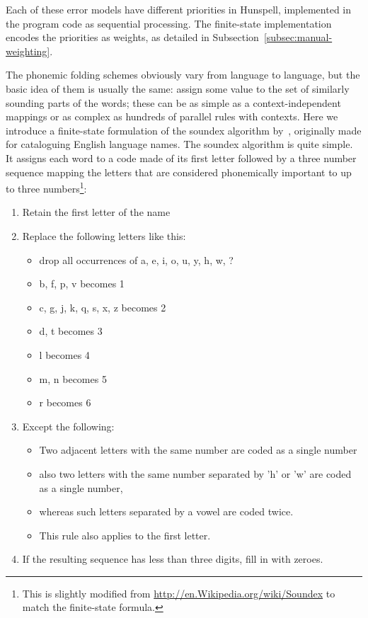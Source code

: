 \documentclass[a4paper,12pt]{article}
\begin{document}
Each of these error models have different priorities in Hunspell, implemented
in the program code as sequential processing. The finite-state implementation
encodes the priorities as weights, as detailed in
Subsection~\ref{subsec:manual-weighting}.

The phonemic folding schemes obviously vary from language to language, but the
basic idea of them is usually the same: assign some value to the set of
similarly sounding parts of the words; these can be as simple as a
context-independent mappings or as complex as hundreds of parallel rules with
contexts. Here we introduce a finite-state formulation of the soundex algorithm
by~\cite{russell1918soundex}, originally made for cataloguing English language
names. The soundex algorithm is quite simple. It assigns each word to a code
made of its first letter followed by a three number sequence mapping the
letters that are considered phonemically important to up to three
numbers\footnote{This is slightly modified from
\url{http://en.Wikipedia.org/wiki/Soundex} to match the finite-state formula.}:

\begin{enumerate}
    \item Retain the first letter of the name 
    \item Replace the following letters like this:\begin{itemize}
            \item drop all occurrences of a, e, i, o, u, y, h, w, ?
            \item b, f, p, v becomes 1
            \item c, g, j, k, q, s, x, z becomes 2
            \item d, t becomes 3
            \item l becomes 4
            \item m, n becomes 5
            \item r becomes 6
        \end{itemize}
    \item Except the following:\begin{itemize}
            \item Two adjacent letters with the same number are coded as a
                single number
            \item also two letters with the same number separated by 'h' or 'w'
                are coded as a single number,
            \item whereas such letters separated by a vowel are coded twice.
            \item This rule also applies to the first letter.
        \end{itemize}
    \item If the resulting sequence has less than three digits, fill in with
        zeroes.
\end{enumerate}
\end{document}
